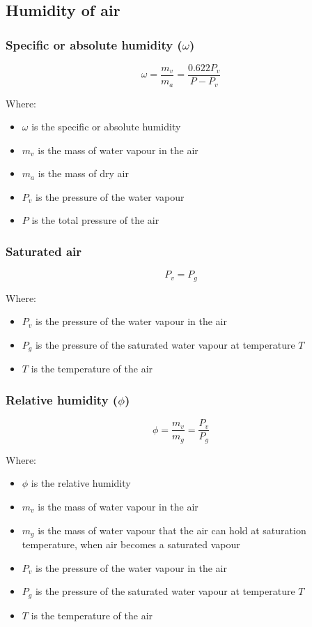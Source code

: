 \documentclass[11pt]{article}
\begin{document}
\subsection{Humidity of air}
\label{sec:org1e5d57e}

\subsubsection{Specific or absolute humidity (\(\omega\))}
\label{sec:orga359520}
\[\omega = \frac{m_v}{m_a} = \frac{0.622 P_v}{P - P_v}\]

Where:
\begin{itemize}
\item \(\omega\) is the specific or absolute humidity
\item \(m_v\) is the mass of water vapour in the air
\item \(m_a\) is the mass of dry air
\item \(P_v\) is the pressure of the water vapour
\item \(P\) is the total pressure of the air
\end{itemize}

\subsubsection{Saturated air}
\label{sec:org032f2b2}
\[P_v = P_g\]

Where:
\begin{itemize}
\item \(P_v\) is the pressure of the water vapour in the air
\item \(P_g\) is the pressure of the saturated water vapour at temperature \(T\)
\item \(T\) is the temperature of the air
\end{itemize}

\subsubsection{Relative humidity (\(\phi\))}
\label{sec:org5f1b620}
\[\phi = \frac{m_v}{m_g} = \frac{P_v}{P_g}\]

Where:
\begin{itemize}
\item \(\phi\) is the relative humidity
\item \(m_v\) is the mass of water vapour in the air
\item \(m_g\) is the mass of water vapour that the air can hold at saturation temperature, when air becomes a saturated vapour
\item \(P_v\) is the pressure of the water vapour in the air
\item \(P_g\) is the pressure of the saturated water vapour at temperature \(T\)
\item \(T\) is the temperature of the air
\end{itemize}
\end{document}
